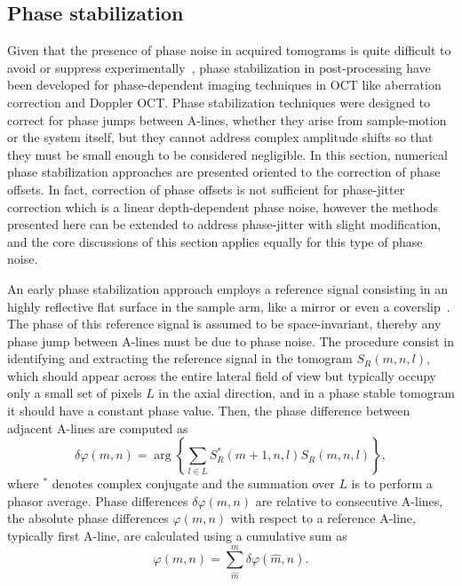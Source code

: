 \subsection{Phase stabilization}

Given that the presence of phase noise in acquired tomograms is quite difficult to avoid or suppress experimentally~\cite{Adie2015_Interferometric}, phase stabilization in post-processing have been developed for phase-dependent imaging techniques in OCT like aberration correction and Doppler OCT. Phase stabilization techniques were designed to correct for phase jumps between A-lines, whether they arise from sample-motion or the system itself, but they cannot address complex amplitude shifts so that they must be small enough to be considered negligible. In this section, numerical phase stabilization approaches are presented oriented to the correction of phase offsets. In fact, correction of phase offsets is not sufficient for phase-jitter correction which is a linear depth-dependent phase noise, however the methods presented here can be extended to address phase-jitter with slight modification, and the core discussions of this section applies equally for this type of phase noise.

An early phase stabilization approach employs a reference signal consisting in an highly reflective flat surface in the sample arm, like a mirror or even a coverslip~\cite{Ralston2006_Phase, Yang2001_Phasereferenced}. The phase of this reference signal is assumed to be space-invariant, thereby any phase jump between A-lines must be due to phase noise. The procedure consist in identifying and extracting the reference signal in the tomogram $S_R(m,n,l)$, which should appear across the entire lateral field of view but typically occupy only a small set of pixels $L$ in the axial direction, and in a phase stable tomogram it should have a constant phase value. Then, the phase difference between adjacent A-lines are computed as 
\begin{equation}\label{eq:PhaseDiff}
	\delta\varphi(m,n) = \arg\left\{\sum_{l\in L} S_R^*(m+1,n,l)S_R(m,n,l)\right\},
\end{equation}
where $^*$ denotes complex conjugate and the summation over $L$ is to perform a phasor average. Phase differences $\delta\varphi(m,n)$ are relative to consecutive A-lines, the absolute phase differences $\varphi(m,n)$ with respect to a reference A-line, typically first A-line, are calculated using a cumulative sum as
\begin{equation} \label{eq:absPhaseDiff}
	\varphi(m,n) = \sum_{\hat{m}}^m \delta\varphi(\hat{m},n).
\end{equation}

